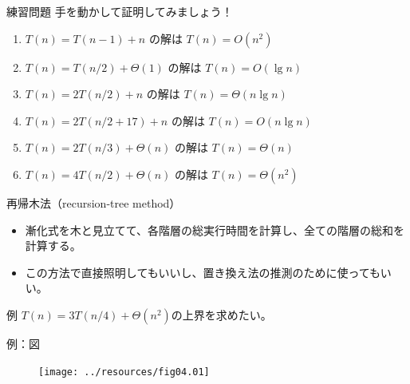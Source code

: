 \documentclass[unicode,11pt,aspectratio=169,notes]{beamer} %
\begin{document}

\begin{frame}{練習問題}
  手を動かして証明してみましょう！
  \begin{enumerate}
    \item $T(n)=T(n-1)+n$ の解は $T(n)=O(n^2)$
    \item $T(n)=T(n/2)+\Theta(1)$ の解は $T(n)=O(\lg n)$
    \item $T(n)=2T(n/2)+n$ の解は $T(n)=\Theta(n\lg n)$
    \item $T(n)=2T(n/2+17)+n$ の解は $T(n)=O(n\lg n)$
    \item $T(n)=2T(n/3)+\Theta(n)$ の解は $T(n)=\Theta(n)$
    \item $T(n)=4T(n/2)+\Theta(n)$ の解は $T(n)=\Theta(n^2)$
  \end{enumerate}
\end{frame}


\begin{frame}{再帰木法（recursion-tree method）}
  \begin{itemize}
    \item 漸化式を木と見立てて、各階層の総実行時間を計算し、全ての階層の総和を計算する。
    \item この方法で直接照明してもいいし、置き換え法の推測のために使ってもいい。
  \end{itemize}
\end{frame}

\begin{frame}{例}
  $T(n)=3T(n/4)+\Theta(n^2)$の上界を求めたい。
\end{frame}

\begin{frame}{例：図}
  \begin{figure}
    \texttt{[image: ../resources/fig04.01]}
  \end{figure}
\end{frame}

\end{document}
